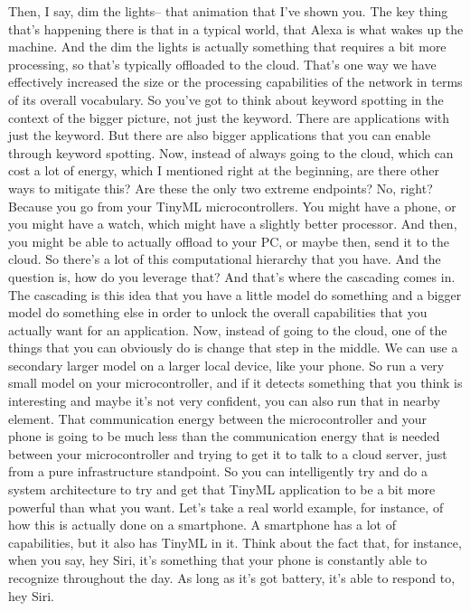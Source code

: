 Then, I say, dim the lights-- that animation that I've shown you.
The key thing that's happening there is that in a typical world,
that Alexa is what wakes up the machine.
And the dim the lights is actually something
that requires a bit more processing, so that's typically
offloaded to the cloud.
That's one way we have effectively increased the size or the processing
capabilities of the network in terms of its overall vocabulary.
So you've got to think about keyword spotting in the context of the bigger
picture, not just the keyword.
There are applications with just the keyword.
But there are also bigger applications that you
can enable through keyword spotting.
Now, instead of always going to the cloud, which
can cost a lot of energy, which I mentioned right at the beginning,
are there other ways to mitigate this?
Are these the only two extreme endpoints?
No, right?
Because you go from your TinyML microcontrollers.
You might have a phone, or you might have a watch, which
might have a slightly better processor.
And then, you might be able to actually offload to your PC,
or maybe then, send it to the cloud.
So there's a lot of this computational hierarchy that you have.
And the question is, how do you leverage that?
And that's where the cascading comes in.
The cascading is this idea that you have a little model
do something and a bigger model do something else in order
to unlock the overall capabilities that you actually want for an application.
Now, instead of going to the cloud, one of the things that you can obviously do
is change that step in the middle.
We can use a secondary larger model on a larger local device, like your phone.
So run a very small model on your microcontroller,
and if it detects something that you think is interesting
and maybe it's not very confident, you can also run that in nearby element.
That communication energy between the microcontroller and your phone
is going to be much less than the communication energy that
is needed between your microcontroller and trying
to get it to talk to a cloud server, just from a pure infrastructure
standpoint.
So you can intelligently try and do a system architecture
to try and get that TinyML application to be
a bit more powerful than what you want.
Let's take a real world example, for instance,
of how this is actually done on a smartphone.
A smartphone has a lot of capabilities, but it also has TinyML in it.
Think about the fact that, for instance, when you say, hey Siri,
it's something that your phone is constantly
able to recognize throughout the day.
As long as it's got battery, it's able to respond to, hey Siri.
